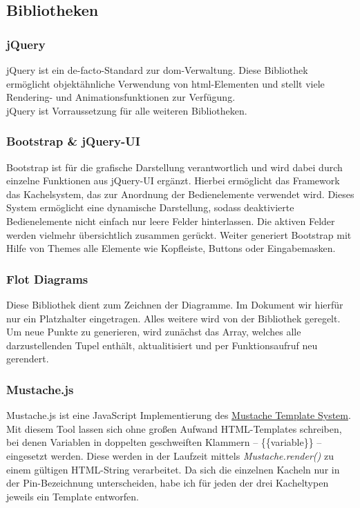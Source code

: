 \subsection{Bibliotheken}

\subsubsection{jQuery}
jQuery ist ein \gls{de-facto-Standard} zur \gls{dom}-Verwaltung. Diese Bibliothek ermöglicht objektähnliche Verwendung von \gls{html}-Elementen und stellt viele Rendering- und Animationsfunktionen zur Verfügung.\\

jQuery ist Vorraussetzung für alle weiteren Bibliotheken.


\subsubsection{Bootstrap \& jQuery-UI}
Bootstrap ist für die grafische Darstellung verantwortlich und wird dabei durch einzelne Funktionen aus jQuery-UI ergänzt. Hierbei ermöglicht das Framework das Kachelsystem, das zur Anordnung der Bedienelemente verwendet wird. Dieses System ermöglicht eine dynamische Darstellung, sodass deaktivierte Bedienelemente nicht einfach nur leere Felder hinterlassen. Die aktiven Felder werden vielmehr übersichtlich zusammen gerückt. Weiter generiert Bootstrap mit Hilfe von Themes alle Elemente wie Kopfleiste, Buttons oder Eingabemasken.\\


\subsubsection{Flot Diagrams}
Diese Bibliothek dient zum Zeichnen der Diagramme. Im Dokument wir hierfür nur ein Platzhalter eingetragen. Alles weitere wird von der Bibliothek geregelt. Um neue Punkte zu generieren, wird zunächst das Array, welches alle darzustellenden Tupel enthält, aktualitisiert und per Funktionsaufruf neu gerendert.


\subsubsection{Mustache.js}
Mustache.js ist eine JavaScript Implementierung des \href{http://mustache.github.io/}{Mustache Template System}. Mit diesem Tool lassen sich ohne großen Aufwand HTML-Templates schreiben, bei denen Variablen in doppelten geschweiften Klammern -- \{\{variable\}\} -- eingesetzt werden. Diese werden in der Laufzeit mittels \textit{Mustache.render()} zu einem gültigen HTML-String verarbeitet. Da sich die einzelnen Kacheln nur in der Pin-Bezeichnung unterscheiden, habe ich für jeden der drei Kacheltypen jeweils ein Template entworfen.